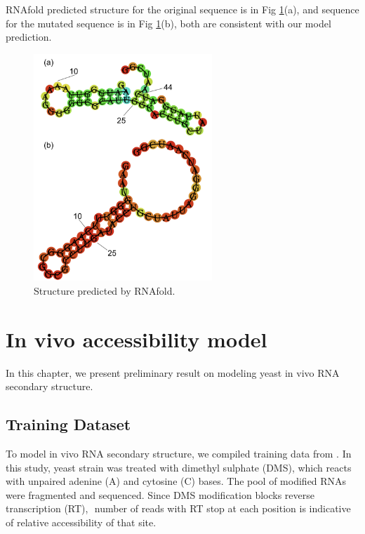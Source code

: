 \documentclass{proposal}
\begin{document}
RNAfold predicted structure for the original sequence is in Fig \ref{fig:base_pair_rnafold_structure}(a),
and sequence for the mutated sequence is in Fig \ref{fig:base_pair_rnafold_structure}(b),
both are consistent with our model prediction.


\begin{figure}[h!]
    \centering
    \includegraphics[width=0.6\textwidth]{plot/base_pair_rnafold_structure.png}
    \caption{Structure predicted by RNAfold.}
    \label{fig:base_pair_rnafold_structure}
    \centering
\end{figure}




\chapter{In vivo accessibility model}

In this chapter, we present preliminary result on modeling yeast in vivo RNA secondary structure.

\section{Training Dataset}

To model in vivo RNA secondary structure, we compiled training data from \cite{rouskin2014genome}.
In this study, yeast strain was treated with ﻿dimethyl sulphate (DMS), which reacts with ﻿unpaired adenine (A) and cytosine (C) bases.
The pool of modified RNAs were fragmented and sequenced.
Since ﻿DMS modification blocks reverse transcription (RT), ﻿
number of reads with RT stop at each position is indicative of relative accessibility of that site.
\end{document}
